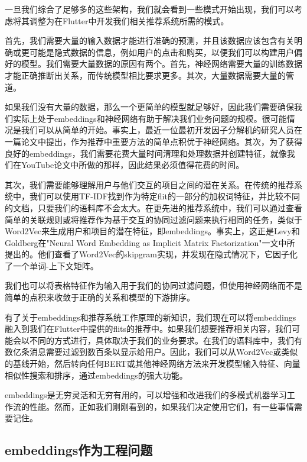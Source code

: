 \documentclass[Chinese, 11pt, table]{diazessay} %
\begin{document}
\begin{CJK}{UTF8}{gbsn}
\begin{sloppypar}
一旦我们综合了足够多的这些架构，我们就会看到一些模式开始出现，我们可以考虑将其调整为在Flutter中开发我们相关推荐系统所需的模式。

首先，我们需要大量的输入数据才能进行准确的预测，并且该数据应该包含有关明确或更可能是隐式数据的信息，例如用户的点击和购买，以便我们可以构建用户偏好的模型。我们需要大量数据的原因有两个。首先，神经网络需要大量的训练数据才能正确推断出关系，而传统模型相比要求更多。其次，大量数据需要大量的管道。

如果我们没有大量的数据，那么一个更简单的模型就足够好，因此我们需要确保我们实际上处于embeddings和神经网络有助于解决我们业务问题的规模。很可能情况是我们可以从简单的开始。事实上，最近一位最初开发因子分解机的研究人员在一篇论文中提出，作为推荐中重要方法的简单点积优于神经网络\citep{rendle2020neural}。其次，为了获得良好的embeddings，我们需要花费大量时间清理和处理数据并创建特征，就像我们在YouTube论文中所做的那样，因此结果必须值得花费的时间。

其次，我们需要能够理解用户与他们交互的项目之间的潜在关系。在传统的推荐系统中，我们可以使用TF-IDF找到作为特定flit的一部分的加权词特征，并比较不同的文档，只要我们的语料库不会太大。在更先进的推荐系统中，我们可以通过查看简单的关联规则或将推荐作为基于交互的协同过滤问题来执行相同的任务，类似于Word2Vec来生成用户和项目的潜在特征，即embeddings。事实上，这正是Levy和Goldberg在"Neural Word Embedding as Implicit Matrix Factorization"一文中所提出的\citep{levy2014neural}。他们查看了Word2Vec的skipgram实现，并发现在隐式情况下，它因子化了一个单词-上下文矩阵。

我们也可以将表格特征作为输入用于我们的协同过滤问题，但使用神经网络\citep{he2017neural}而不是简单的点积来收敛于正确的关系和模型的下游排序。

有了关于embeddings和推荐系统工作原理的新知识，我们现在可以将embeddings融入到我们在Flutter中提供的flits的推荐中。如果我们想要推荐相关内容，我们可能会以不同的方式进行，具体取决于我们的业务要求。在我们的语料库中，我们有数亿条消息需要过滤到数百条以显示给用户。因此，我们可以从Word2Vec或类似的基线开始，然后转向任何BERT或其他神经网络方法来开发模型输入特征、向量相似性搜索和排序，通过embeddings的强大功能。

embeddings是无穷灵活和无穷有用的，可以增强和改进我们的多模式机器学习工作流的性能。然而，正如我们刚刚看到的，如果我们决定使用它们，有一些事情需要记住。

\subsection{embeddings作为工程问题}


\end{sloppypar}
\end{CJK}
\end{document}
